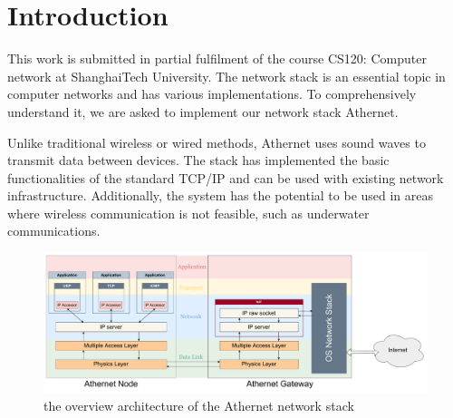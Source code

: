 \section{Introduction}
This work is submitted in partial fulfilment of the course CS120: Computer network at ShanghaiTech University. The network stack is an essential topic in computer networks and has various implementations. To comprehensively understand it, we are asked to implement our network stack Athernet. \par
Unlike traditional wireless or wired methods, Athernet uses sound waves to transmit data between devices. The stack has implemented the basic functionalities of the standard TCP/IP and can be used with existing network infrastructure. Additionally, the system has the potential to be used in areas where wireless communication is not feasible, such as underwater communications.\par
\begin{figure}[H]
	\begin{center}
		\centerline{\includegraphics[width=\columnwidth]{./figures/overview.pdf}}
		\caption{the overview architecture of the Athernet network stack}
		\label{overview}
	\end{center}
\end{figure}

